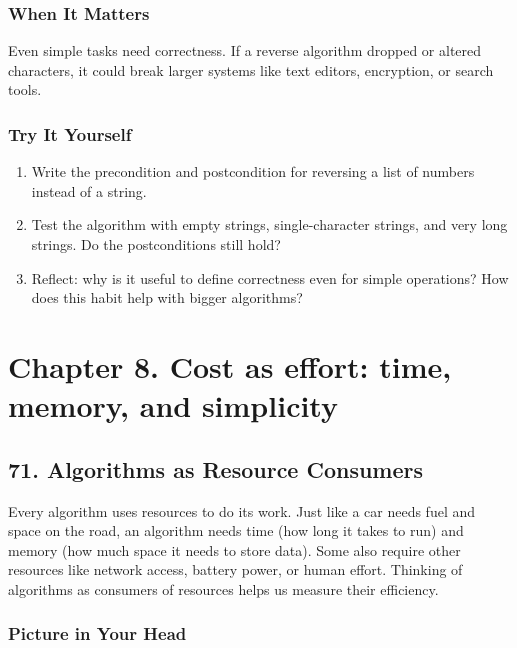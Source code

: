 \documentclass[
  letterpaper,
  DIV=11,
  numbers=noendperiod]{scrreprt}
\providecommand{\tightlist}{%
  \setlength{\itemsep}{0pt}\setlength{\parskip}{0pt}}
\begin{document}
\subsubsection{When It Matters}\label{when-it-matters-68}

Even simple tasks need correctness. If a reverse algorithm dropped or
altered characters, it could break larger systems like text editors,
encryption, or search tools.

\subsubsection{Try It Yourself}\label{try-it-yourself-70}

\begin{enumerate}
\def\labelenumi{\arabic{enumi}.}
\tightlist
\item
  Write the precondition and postcondition for reversing a list of
  numbers instead of a string.
\item
  Test the algorithm with empty strings, single-character strings, and
  very long strings. Do the postconditions still hold?
\item
  Reflect: why is it useful to define correctness even for simple
  operations? How does this habit help with bigger algorithms?
\end{enumerate}

\section{Chapter 8. Cost as effort: time, memory, and
simplicity}\label{chapter-8.-cost-as-effort-time-memory-and-simplicity}

\subsection{71. Algorithms as Resource
Consumers}\label{algorithms-as-resource-consumers}

Every algorithm uses resources to do its work. Just like a car needs
fuel and space on the road, an algorithm needs time (how long it takes
to run) and memory (how much space it needs to store data). Some also
require other resources like network access, battery power, or human
effort. Thinking of algorithms as consumers of resources helps us
measure their efficiency.

\subsubsection{Picture in Your Head}\label{picture-in-your-head-71}
\end{document}
